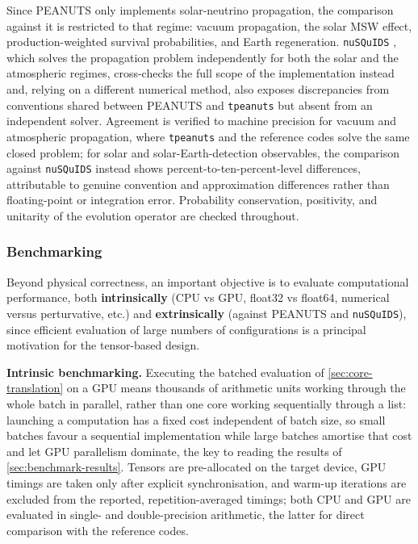 Since PEANUTS only implements solar-neutrino propagation, the comparison against it is restricted to that regime: vacuum propagation, the solar MSW effect, production-weighted survival probabilities, and Earth regeneration. \texttt{nuSQuIDS} \parencite{nuSQuIDS}, which solves the propagation problem independently for both the solar and the atmospheric regimes, cross-checks the full scope of the implementation instead and, relying on a different numerical method, also exposes discrepancies from conventions shared between PEANUTS and \texttt{tpeanuts} but absent from an independent solver. Agreement is verified to machine precision for vacuum and atmospheric propagation, where \texttt{tpeanuts} and the reference codes solve the same closed problem; for solar and solar-Earth-detection observables, the comparison against \texttt{nuSQuIDS} instead shows percent-to-ten-percent-level differences, attributable to genuine convention and approximation differences rather than floating-point or integration error. Probability conservation, positivity, and unitarity of the evolution operator are checked throughout.

\subsubsection{Benchmarking}
\label{sec:benchmarking-methodology}

Beyond physical correctness, an important objective is to evaluate computational performance, both \textbf{intrinsically} (CPU vs GPU, float32 vs float64, numerical versus perturvative, etc.) and \textbf{extrinsically} (against PEANUTS and \texttt{nuSQuIDS}), since efficient evaluation of large numbers of configurations is a principal motivation for the tensor-based design.

\textbf{Intrinsic benchmarking.} Executing the batched evaluation of \cref{sec:core-translation} on a GPU means thousands of arithmetic units working through the whole batch in parallel, rather than one core working sequentially through a list: launching a computation has a fixed cost independent of batch size, so small batches favour a sequential implementation while large batches amortise that cost and let GPU parallelism dominate, the key to reading the results of \cref{sec:benchmark-results}. Tensors are pre-allocated on the target device, GPU timings are taken only after explicit synchronisation, and warm-up iterations are excluded from the reported, repetition-averaged timings; both CPU and GPU are evaluated in single- and double-precision arithmetic, the latter for direct comparison with the reference codes.

